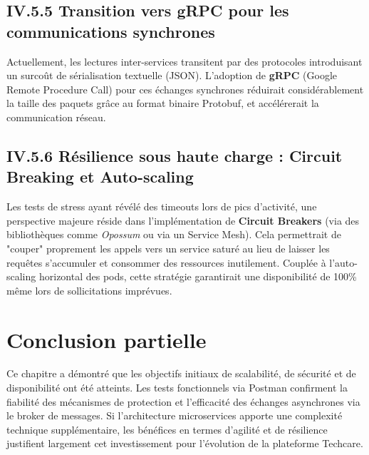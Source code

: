 \subsection{IV.5.5 Transition vers gRPC pour les communications synchrones}
Actuellement, les lectures inter-services transitent par des protocoles introduisant un surcoût de sérialisation textuelle (JSON). L'adoption de \textbf{gRPC} (Google Remote Procedure Call) pour ces échanges synchrones réduirait considérablement la taille des paquets grâce au format binaire Protobuf, et accélérerait la communication réseau.

\subsection{IV.5.6 Résilience sous haute charge : Circuit Breaking et Auto-scaling}
Les tests de stress ayant révélé des timeouts lors de pics d'activité, une perspective majeure réside dans l'implémentation de \textbf{Circuit Breakers} (via des bibliothèques comme \textit{Opossum} ou via un Service Mesh). Cela permettrait de "couper" proprement les appels vers un service saturé au lieu de laisser les requêtes s'accumuler et consommer des ressources inutilement. Couplée à l'auto-scaling horizontal des pods, cette stratégie garantirait une disponibilité de 100\% même lors de sollicitations imprévues.
\section*{Conclusion partielle}
Ce chapitre a démontré que les objectifs initiaux de scalabilité, de sécurité et de disponibilité ont été atteints. Les tests fonctionnels via Postman confirment la fiabilité des mécanismes de protection et l'efficacité des échanges asynchrones via le broker de messages. Si l'architecture microservices apporte une complexité technique supplémentaire, les bénéfices en termes d'agilité et de résilience justifient largement cet investissement pour l'évolution de la plateforme Techcare.
